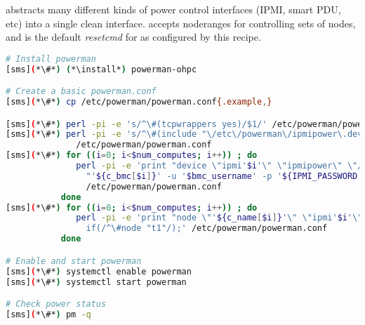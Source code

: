 \powerman{} abstracts many different kinds of power control interfaces (IPMI, 
smart PDU, etc) into a single clean interface. \powerman{} accepts noderanges
for controlling sets of nodes, and is the default {\em resetcmd} for \conman{}
as configured by this recipe.

\begin{lstlisting}[language=bash,keywords={},upquote=true]
# Install powerman
[sms](*\#*) (*\install*) powerman-ohpc

# Create a basic powerman.conf
[sms](*\#*) cp /etc/powerman/powerman.conf{.example,}

[sms](*\#*) perl -pi -e 's/^\#(tcpwrappers yes)/$1/' /etc/powerman/powerman.conf
[sms](*\#*) perl -pi -e 's/^\#(include "\/etc\/powerman\/ipmipower\.dev")/$1/' \
              /etc/powerman/powerman.conf
[sms](*\#*) for ((i=0; i<$num_computes; i++)) ; do
              perl -pi -e 'print "device \"ipmi'$i'\" \"ipmipower\" \"/usr/sbin/ipmipower -h ".
                "'${c_bmc[$i]}' -u '$bmc_username' -p '${IPMI_PASSWORD:-undefined}'|&\"\n" if(/^\#device "ipmi1"/);' \
                /etc/powerman/powerman.conf
           done
[sms](*\#*) for ((i=0; i<$num_computes; i++)) ; do
              perl -pi -e 'print "node \"'${c_name[$i]}'\" \"ipmi'$i'\" \"'${c_bmc[$i]}'\"\n"
                if(/^\#node "t1"/);' /etc/powerman/powerman.conf
           done

# Enable and start powerman
[sms](*\#*) systemctl enable powerman
[sms](*\#*) systemctl start powerman

# Check power status
[sms](*\#*) pm -q
\end{lstlisting}

